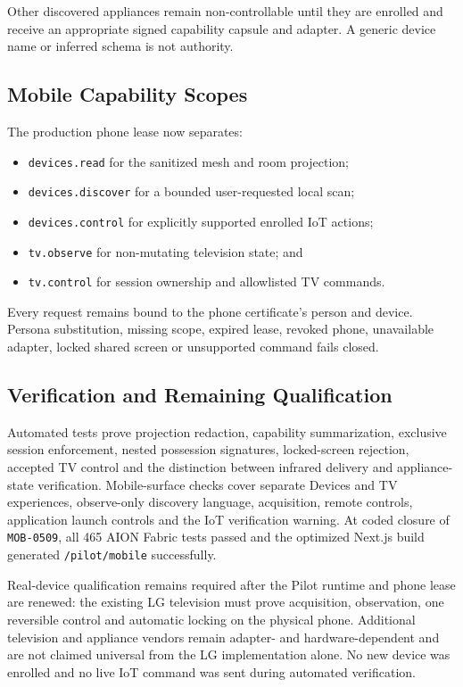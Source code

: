 Other discovered appliances remain non-controllable until they are enrolled and receive an
appropriate signed capability capsule and adapter.  A generic device name or inferred schema is
not authority.

\subsection{Mobile Capability Scopes}

The production phone lease now separates:
\begin{itemize}
  \item \texttt{devices.read} for the sanitized mesh and room projection;
  \item \texttt{devices.discover} for a bounded user-requested local scan;
  \item \texttt{devices.control} for explicitly supported enrolled IoT actions;
  \item \texttt{tv.observe} for non-mutating television state; and
  \item \texttt{tv.control} for session ownership and allowlisted TV commands.
\end{itemize}

Every request remains bound to the phone certificate's person and device.  Persona substitution,
missing scope, expired lease, revoked phone, unavailable adapter, locked shared screen or
unsupported command fails closed.

\subsection{Verification and Remaining Qualification}

Automated tests prove projection redaction, capability summarization, exclusive session
enforcement, nested possession signatures, locked-screen rejection, accepted TV control and the
distinction between infrared delivery and appliance-state verification.  Mobile-surface checks
cover separate Devices and TV experiences, observe-only discovery language, acquisition, remote
controls, application launch controls and the IoT verification warning.  At coded closure of
\texttt{MOB-0509}, all 465 AION Fabric tests passed and the optimized Next.js build generated
\texttt{/pilot/mobile} successfully.

Real-device qualification remains required after the Pilot runtime and phone lease are renewed:
the existing LG television must prove acquisition, observation, one reversible control and
automatic locking on the physical phone.  Additional television and appliance vendors remain
adapter- and hardware-dependent and are not claimed universal from the LG implementation alone.
No new device was enrolled and no live IoT command was sent during automated verification.
\endgroup
